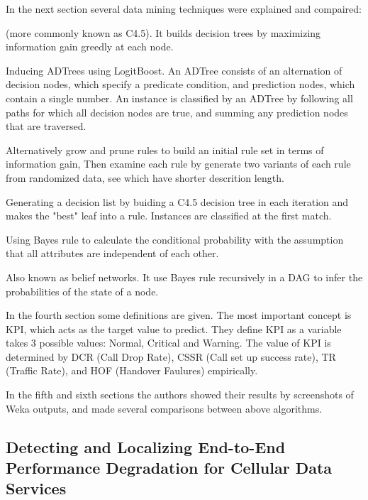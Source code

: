 \documentclass{manuscript}
\begin{document}
    In the next section several data mining techniques were explained and compaired:
    \begin{description}
        \item[J48 tree] (more commonly known as C4.5). It builds decision trees by maximizing information gain greedly at
                        each node.\textsuperscript{\cite{quinlan_c4.5:_1993}}
        \item[LAD tree] Inducing ADTrees using LogitBoost. An ADTree consists of an alternation of decision nodes, which
                        specify a predicate condition, and prediction nodes, which contain a single number. An instance
                        is classified by an ADTree by following all paths for which all decision nodes are true, and
                        summing any prediction nodes that are traversed.\textsuperscript{\cite{holmes_multiclass_2002}}
        \item[JRip] Alternatively grow and prune rules to build an initial rule set in terms of information gain, Then
                    examine each rule by generate two variants of each rule from randomized data, see which have shorter
                    descrition length.\textsuperscript{\cite{cohen_fast_1995}}
        \item[PART] Generating a decision list by buiding a C4.5 decision tree in each iteration and makes the "best" leaf
                    into a rule. Instances are classified at the first match.\textsuperscript{\cite{frank_generating_1998}}
        \item[Naïve Bayes] Using Bayes rule to calculate the conditional probability with the assumption that all
                           attributes are independent of each other.\textsuperscript{\cite{john_estimating_1995}}
        \item[Bayesnet] Also known as belief networks. It use Bayes rule recursively in a DAG to infer the probabilities
                        of the state of a node.\textsuperscript{\cite{barco_comparison_2006}}
    \end{description}

    In the fourth section some definitions are given. The most important concept is KPI, which acts as the target value
    to predict. They define KPI as a variable takes 3 possible values: Normal, Critical and Warning. The value of KPI is
    determined by DCR (Call Drop Rate), CSSR (Call set up success rate), TR (Traffic Rate), and HOF (Handover Faulures)
    empirically.

    In the fifth and sixth sections the authors showed their results by screenshots of Weka outputs, and made several
    comparisons between above algorithms.

    \subsection{Detecting and Localizing End-to-End Performance Degradation for Cellular Data Services \textsuperscript{\cite{ahmed_detecting_2016}}}


    
    
\end{document}
